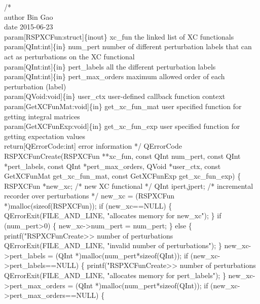 /*%
    \\author Bin Gao
    \\date 2015-06-23
    \\param[RSPXCFun:struct]\{inout\} xc_fun the linked list of XC functionals
    \\param[QInt:int]\{in\} num_pert number of different perturbation labels that can
        act as perturbations on the XC functional
    \\param[QInt:int]\{in\} pert_labels all the different perturbation labels
    \\param[QInt:int]\{in\} pert_max_orders maximum allowed order of each perturbation (label)
    \\param[QVoid:void]\{in\} user_ctx user-defined callback function context
    \\param[GetXCFunMat:void]\{in\} get_xc_fun_mat user specified function for
        getting integral matrices
    \\param[GetXCFunExp:void]\{in\} get_xc_fun_exp user specified function for
        getting expectation values
    \\return[QErrorCode:int] error information
*/
QErrorCode RSPXCFunCreate(RSPXCFun **xc_fun,
                          const QInt num_pert,
                          const QInt *pert_labels,
                          const QInt *pert_max_orders,
                          QVoid *user_ctx,
                          const GetXCFunMat get_xc_fun_mat,
                          const GetXCFunExp get_xc_fun_exp)
\{
    RSPXCFun *new_xc;  /* new XC functional */
    QInt ipert,jpert;  /* incremental recorder over perturbations */
    new_xc = (RSPXCFun *)malloc(sizeof(RSPXCFun));
    if (new_xc==NULL) \{
        QErrorExit(FILE_AND_LINE, "allocates memory for new_xc");
    \}
    if (num_pert>0) \{
        new_xc->num_pert = num_pert;
    \}
    else \{
        printf("RSPXCFunCreate>> number of perturbations %
        QErrorExit(FILE_AND_LINE, "invalid number of perturbations");
    \}
    new_xc->pert_labels = (QInt *)malloc(num_pert*sizeof(QInt));
    if (new_xc->pert_labels==NULL) \{
        printf("RSPXCFunCreate>> number of perturbations %
        QErrorExit(FILE_AND_LINE, "allocates memory for pert_labels");
    \}
    new_xc->pert_max_orders = (QInt *)malloc(num_pert*sizeof(QInt));
    if (new_xc->pert_max_orders==NULL) \{
